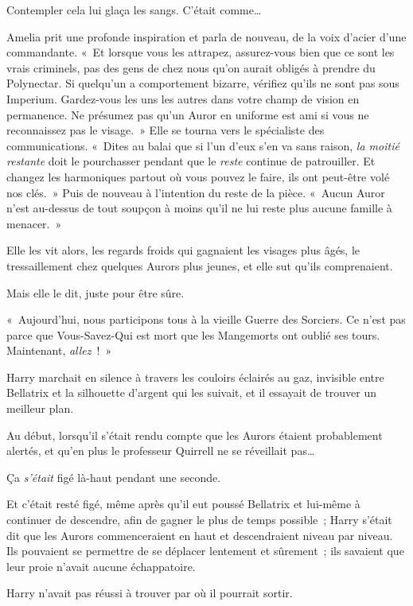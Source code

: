 Contempler cela lui glaça les sangs. C'était comme…

Amelia prit une profonde inspiration et parla de nouveau, de la voix d'acier d'une commandante. «~Et lorsque vous les attrapez, assurez-vous bien que ce sont les vrais criminels, pas des gens de chez nous qu'on aurait obligés à prendre du Polynectar. Si quelqu'un a comportement bizarre, vérifiez qu'ils ne sont pas sous Imperium. Gardez-vous les uns les autres dans votre champ de vision en permanence. Ne présumez pas qu'un Auror en uniforme est ami si vous ne reconnaissez pas le visage.~» Elle se tourna vers le spécialiste des communications. «~Dites au balai que si l'un d'eux s'en va sans raison, \emph{la moitié restante} doit le pourchasser pendant que le \emph{reste} continue de patrouiller. Et changez les harmoniques partout où vous pouvez le faire, ils ont peut-être volé nos clés.~» Puis de nouveau à l'intention du reste de la pièce. «~Aucun Auror n'est au-dessus de tout soupçon à moins qu'il ne lui reste plus aucune famille à menacer.~»

Elle les vit alors, les regards froids qui gagnaient les visages plus âgés, le tressaillement chez quelques Aurors plus jeunes, et elle sut qu'ils comprenaient.

Mais elle le dit, juste pour être sûre.

«~Aujourd'hui, nous participons tous à la vieille Guerre des Sorciers. Ce n'est pas parce que Vous-Savez-Qui est mort que les Mangemorts ont oublié ses tours. Maintenant, \emph{allez}~!~»

\later

Harry marchait en silence à travers les couloirs éclairés au gaz, invisible entre Bellatrix et la silhouette d'argent qui les suivait, et il essayait de trouver un meilleur plan.

Au début, lorsqu'il s'était rendu compte que les Aurors étaient probablement alertés, et qu'en plus le professeur Quirrell ne se réveillait pas…

Ça \emph{s'était} figé là-haut pendant une seconde.

Et c'était resté figé, même après qu'il eut poussé Bellatrix et lui-même à continuer de descendre, afin de gagner le plus de temps possible~; Harry s'était dit que les Aurors commenceraient en haut et descendraient niveau par niveau. Ils pouvaient se permettre de se déplacer lentement et sûrement~; ils savaient que leur proie n'avait aucune échappatoire.

Harry n'avait pas réussi à trouver par où il pourrait sortir.

